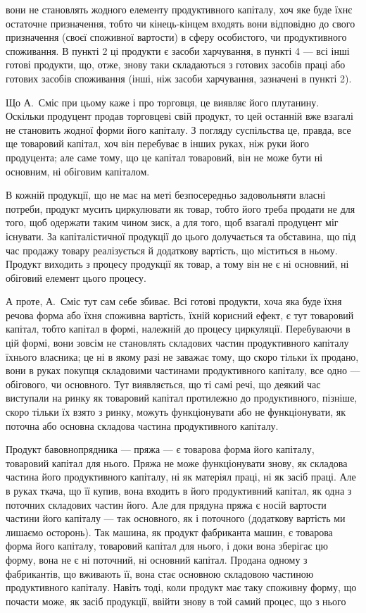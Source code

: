 \parcont{}  %
вони не становлять жодного елементу продуктивного капіталу, хоч яке
буде їхнє остаточне призначення, тобто чи кінець-кінцем входять вони
відповідно до свого призначення (своєї споживної вартости) в сферу особистого,
чи продуктивного споживання. В пункті 2 ці продукти є засоби
харчування, в пункті 4 — всі інші готові продукти, що, отже, знову таки
складаються з готових засобів праці або готових засобів споживання
(інші, ніж засоби харчування, зазначені в пункті 2).

Що А.~Сміс при цьому каже і про торговця, це виявляє його плутанину.
Оскільки продуцент продав торговцеві свій продукт, то цей останній
вже взагалі не становить жодної форми його капіталу. З погляду
суспільства це, правда, все ще товаровий капітал, хоч він перебуває в
інших руках, ніж руки його продуцента; але саме тому, що це капітал
товаровий, він не може бути ні основним, ні обіговим капіталом.

В кожній продукції, що не має на меті безпосередньо задовольняти
власні потреби, продукт мусить циркулювати як товар, тобто його
треба продати не для того, щоб одержати таким чином зиск, а для того,
щоб взагалі продуцент міг існувати. За капіталістичної продукції до
цього долучається та обставина, що під час продажу товару реалізується
й додаткову вартість, що міститься в ньому. Продукт виходить з процесу
продукції як товар, а тому він не є ні основний, ні обіговий елемент
цього процесу.

А проте, А.~Сміс тут сам себе збиває. Всі готові продукти, хоча
яка буде їхня речова форма або їхня споживна вартість, їхній корисний
ефект, є тут товаровий капітал, тобто капітал в формі, належній до процесу
циркуляції. Перебуваючи в цій формі, вони зовсім не становлять
складових частин продуктивного капіталу їхнього власника; це ні в якому
разі не заважає тому, що скоро тільки їх продано, вони  в
руках покупця складовими частинами продуктивного капіталу, все одно —
обігового, чи основного. Тут виявляється, що ті самі речі, що деякий
час виступали на ринку як товаровий капітал протилежно до продуктивного,
пізніше, скоро тільки їх взято з ринку, можуть функціонувати або
не функціонувати, як поточна або основна складова частина продуктивного
капіталу.

Продукт бавовнопрядника — пряжа — є товарова форма його капіталу,
товаровий капітал для нього. Пряжа не може функціонувати знову, як
складова частина його продуктивного капіталу, ні як матеріял праці, ні
як засіб праці. Але в руках ткача, що її купив, вона входить в його
продуктивний капітал, як одна з поточних складових частин його. Але
для прядуна пряжа є носій вартости частини його капіталу — так основного,
як і поточного (додаткову вартість ми лишаємо осторонь). Так
машина, як продукт фабриканта машин, є товарова форма його капіталу,
товаровий капітал для нього, і доки вона зберігає цю форму, вона не є
ні поточний, ні основний капітал. Продана одному з фабрикантів, що
вживають її, вона стає основною складовою частиною продуктивного капіталу.
Навіть тоді, коли продукт має таку споживну форму, що почасти
може, як засіб продукції, ввійти знову в той самий процес, що з нього
\parbreak{}  %
